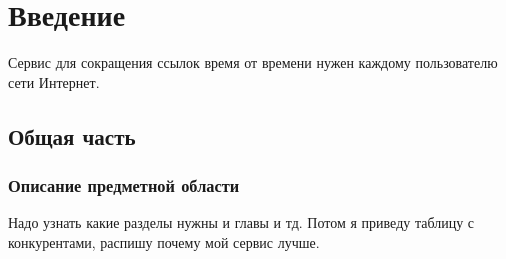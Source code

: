 \documentclass[a5paper,12pt]{extreport}
\begin{document}

    \chapter{Введение}
    Сервис для сокращения ссылок время от времени нужен каждому пользователю сети Интернет.
    \section{Общая часть}
    \subsection{Описание предметной области}
    Надо узнать какие разделы нужны и главы и тд.
    Потом я приведу таблицу с конкурентами, распишу почему мой сервис лучше.
\end{document}
